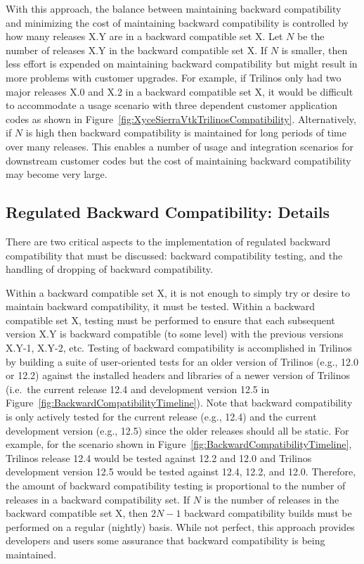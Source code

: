 \documentclass[11pt]{SANDreport}
\begin{document}
With this approach, the balance between maintaining backward
compatibility and minimizing the cost of maintaining backward
compatibility is controlled by how many releases X.Y are in a
backward compatible set X.  Let $N$ be the number of releases X.Y in
the backward compatible set X.  If $N$ is smaller, then less effort is
expended on maintaining backward compatibility but might result in
more problems with customer upgrades.  For example, if Trilinos only
had two major releases X.0 and X.2 in a backward compatible set X, it
would be difficult to accommodate a usage scenario with three
dependent customer application codes as shown in
Figure~\ref{fig:XyceSierraVtkTrilinosCompatibility}.  Alternatively,
if $N$ is high then backward compatibility is maintained for long
periods of time over many releases.  This enables a number of usage
and integration scenarios for downstream customer codes but the cost
of maintaining backward compatibility may become very large.


%
{}\subsection{Regulated Backward Compatibility: Details}
\label{sec:details_reg_back_compat}
%

There are two critical aspects to the implementation of regulated
backward compatibility that must be discussed: backward compatibility
testing, and the handling of dropping of backward compatibility.

Within a backward compatible set X, it is not enough to simply try or
desire to maintain backward compatibility, it must be tested.  Within a
backward compatible set X, testing must be performed to ensure that
each subsequent version X.Y is backward compatible (to some level)
with the previous versions X.Y-1, X.Y-2, etc.  Testing of backward
compatibility is accomplished in Trilinos by building a suite of
user-oriented tests for an older version of Trilinos (e.g., 12.0 or
12.2) against the installed headers and libraries of a newer version
of Trilinos (i.e.\ the current release 12.4 and development version
12.5 in Figure~\ref{fig:BackwardCompatibilityTimeline}).  Note that
backward compatibility is only actively tested for the current release
(e.g., 12.4) and the current development version (e.g., 12.5) since
the older releases should all be static.  For example, for the
scenario shown in Figure~\ref{fig:BackwardCompatibilityTimeline},
Trilinos release 12.4 would be tested against 12.2 and 12.0 and
Trilinos development version 12.5 would be tested against 12.4, 12.2,
and 12.0.  Therefore, the amount of backward compatibility testing is
proportional to the number of releases in a backward compatibility
set.  If $N$ is the number of releases in the backward compatible set
X, then $2 N-1$ backward compatibility builds must be performed on a
regular (nightly) basis.  While not perfect, this approach provides
developers and users some assurance that backward compatibility is
being maintained.
\end{document}
